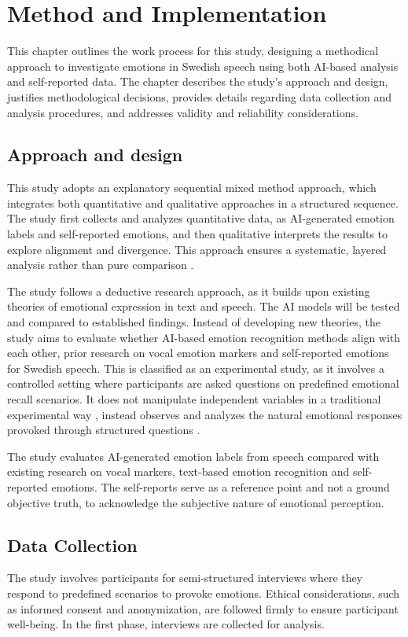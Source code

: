 \chapter{Method and Implementation}

This chapter outlines the work process for this study, designing a methodical approach to investigate emotions in Swedish speech using both AI-based analysis and self-reported data. The chapter describes the study’s approach and design, justifies methodological decisions, provides details regarding data collection and analysis procedures, and addresses validity and reliability considerations. 

\section{Approach and design}
This study adopts an explanatory sequential mixed method approach, which integrates both quantitative and qualitative approaches in a structured sequence. The study first collects and analyzes quantitative data, as AI-generated emotion labels and self-reported emotions, and then qualitative interprets the results to explore alignment and divergence. This approach ensures a systematic, layered analysis rather than pure comparison \autocite{Creswell2023}.  

The study follows a deductive research approach, as it builds upon existing theories of emotional expression in text and speech. The AI models will be tested and compared to established findings. Instead of developing new theories, the study aims to evaluate whether AI-based emotion recognition methods align with each other, prior research on vocal emotion markers and self-reported emotions for Swedish speech. 
This is classified as an experimental study, as it involves a controlled setting where participants are asked questions on predefined emotional recall scenarios. It does not manipulate independent variables in a traditional experimental way \autocite{Creswell2023}, instead observes and analyzes the natural emotional responses provoked through structured questions \autocite{Bryman2022}.

The study evaluates AI-generated emotion labels from speech compared with existing research on vocal markers, text-based emotion recognition and self-reported emotions. The self-reports serve as a reference point and not a ground objective truth, to acknowledge the subjective nature of emotional perception.  

\section{Data Collection}
The study involves participants for semi-structured interviews where they respond to predefined scenarios to provoke emotions. Ethical considerations, such as informed consent and anonymization, are followed firmly to ensure participant well-being. In the first phase, interviews are collected for analysis. 

